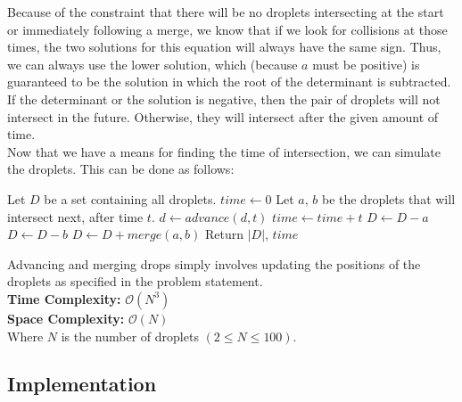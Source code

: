 Because of the constraint that there will be no droplets intersecting at the
start or immediately following a merge, we know that if we look for collisions
at those times, the two solutions for this equation will always have the same
sign. Thus, we can always use the lower solution, which (because $a$ must be
positive) is guaranteed to be the solution in which the root of the determinant
is subtracted. If the determinant or the solution is negative, then the pair
of droplets will not intersect in the future. Otherwise, they will intersect
after the given amount of time.\\

Now that we have a means for finding the time of intersection, we can simulate
the droplets. This can be done as follows:
\hfill\break
\begin{algorithmic}
  \State Let $D$ be a set containing all droplets.
  \State $time \gets 0$
    \State Let $a$, $b$ be the droplets that will intersect next, after time $t$.
      \State $d \gets advance(d, t)$
    \EndFor
    \State $time \gets time + t$
    \State $D \gets D - a$
    \State $D \gets D - b$
    \State $D \gets D + merge(a, b)$
  \EndWhile
  \State Return $|D|$, $time$
\end{algorithmic}
\hfill\break
Advancing and merging drops simply involves updating the positions of the
droplets as specified in the problem statement.\\
\hfill\break
\textbf{Time Complexity:} $\mathcal{O}(N^{3})$\\
\textbf{Space Complexity:} $\mathcal{O}(N)$\\
Where $N$ is the number of droplets $(2 \leq N \leq 100)$.
\pagebreak
\subsection{Implementation}

\pagebreak

\pagebreak

\pagebreak
